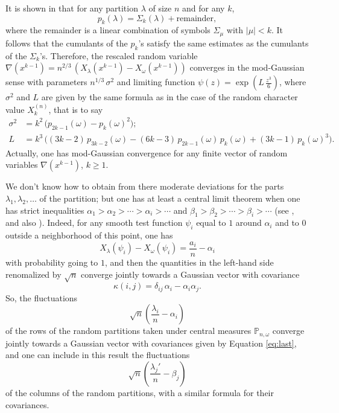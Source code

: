 \documentclass[12pt,a4paper,reqno]{amsart}
\theoremstyle{remark}
\newcommand{\proba}{\mathbb{P}}
\newcommand{\SubGraph}{X^{(n)}}
\begin{document}
It is shown in \cite{IO02} that for any partition $\lambda$ of size $n$ and for any $k$,
$$p_{k}(\lambda)=\varSigma_{k}(\lambda)+\text{remainder},$$
where the remainder is a linear combination of symbols $\varSigma_{\mu}$ with $|\mu|<k$. It follows that the cumulants of the $p_{k}$'s satisfy the same estimates as the cumulants of the $\varSigma_{k}$'s. Therefore, the rescaled random variable 
$\nabla(x^{k-1})=n^{2/3}\,(X_{\lambda}(x^{k-1})-X_{\omega}(x^{k-1}))$
converges in the mod-Gaussian sense with parameters $n^{1/3}\,\sigma^{2}$ and limiting function $\psi(z)=\exp(L\,\frac{z^{3}}{6})$, where $\sigma^{2}$ and $L$ are given by the same formula as in the case of the random character value $\SubGraph_{k}$, that is to say
\begin{align*}
\sigma^{2}&=k^{2}\,\big(p_{2k-1}(\omega)-p_{k}(\omega)^{2}\big);\\
L&= k^{3}\,\big((3k-2)\,p_{3k-2}(\omega)-(6k-3)\,p_{2k-1}(\omega)\,p_{k}(\omega)+(3k-1)\,p_{k}(\omega)^{3}\big).
\end{align*}
Actually, one has mod-Gaussian convergence for any finite vector of random variables $\nabla(x^{k-1})$, $k \geq 1$.
\bigskip

We don't know how to obtain from there moderate deviations for the parts $\lambda_{1},\lambda_{2},\ldots$ of the partition; but one has at least a central limit theorem when one has strict inequalities $\alpha_{1} > \alpha_{2} > \cdots > \alpha_{i} > \cdots$ and $\beta_{1} > \beta_{2} > \cdots > \beta_{i} > \cdots$ (see \cite{Mel12}, and also \cite{Buf12}). Indeed, for any smooth test function $\psi_{i}$ equal to $1$  around $\alpha_{i}$ and to $0$ outside a neighborhood of this point, one has
\begin{equation}
X_{\lambda}(\psi_{i})-X_{\omega}(\psi_{i}) = \frac{a_{i}}{n}-\alpha_{i} \label{eq:almostalwaystrue}
\end{equation}
with probability going to $1$, and then the quantities in the left-hand side renomalized by $\sqrt{n}$ converge jointly towards a Gaussian vector with covariance
\begin{equation}\kappa(i,j)=\delta_{ij}\,\alpha_{i}-\alpha_{i}\alpha_{j}.\label{eq:last}\end{equation}
So, the fluctuations $$\sqrt{n}\left(\frac{\lambda_{i}}{n}-\alpha_{i}\right)$$ of the rows of the random partitions taken under central measures $\proba_{n,\omega}$ converge jointly towards a Gaussian vector with covariances given by Equation \eqref{eq:last}, and one can include in this result the fluctuations
$$\sqrt{n}\left(\frac{\lambda_{j}'}{n}-\beta_{j}\right)$$ of the columns of the random partitions, with a similar formula for their covariances. \bigskip
\end{document}
